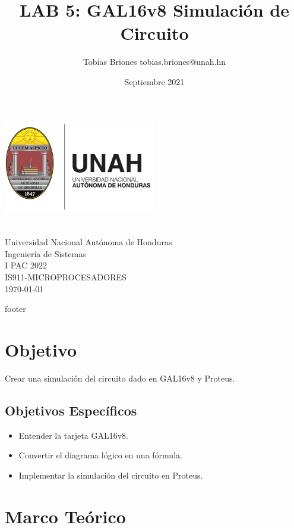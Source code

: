 \documentclass{article}
\title{LAB 5: GAL16v8 Simulación de Circuito}
\author{Tobias Briones \bigbreak tobias.briones@unah.hn}
\date{Septiembre 2021}
\begin{document}
    \makeatletter
    \begin{titlepage}
        \begin{center}
            \includegraphics[width=0.3\linewidth]{images/logo-unah}\\[4ex]
            {\huge \bfseries \@title
            \vspace{1cm}}\\[2ex]
            {\LARGE \@author}\\[50ex]

            {\large
            Universidad Nacional Autónoma de Honduras\\
            Ingeniería de Sistemas\\
            I PAC 2022\\
            IS911-MICROPROCESADORES
            }\\[2ex]

            {\large \today}
        \end{center}
    \end{titlepage}
    \makeatother
    \thispagestyle{empty}
    \newpage

    {footer}

    \section{Objetivo}\label{sec:objetivo}

    Crear una simulación del circuito dado en GAL16v8 y Proteus.

    \subsection{Objetivos Específicos}\label{subsec:objetivos-específicos}

    \begin{itemize}
        \item Entender la tarjeta GAL16v8.
        \item Convertir el diagrama lógico en una fórmula.
        \item Implementar la simulación del circuito en Proteus.
    \end{itemize}

    \section{Marco Teórico}\label{sec:marco-teórico}
\end{document}
